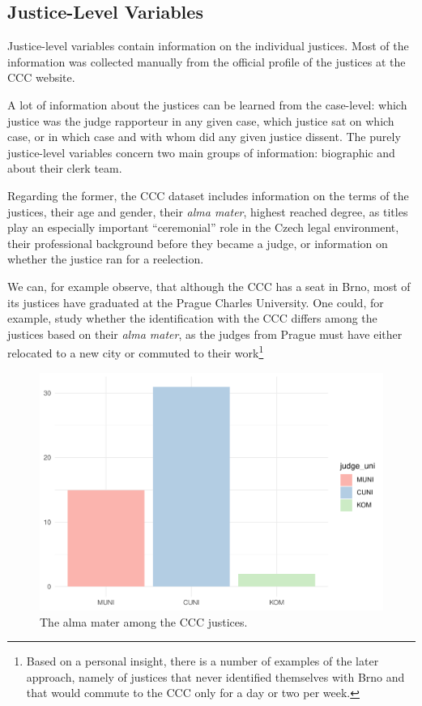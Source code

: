 \documentclass[
  11pt,
]{article}
\begin{document}
\hypertarget{justice-level-variables}{%
\subsection{Justice-Level Variables}\label{justice-level-variables}}

Justice-level variables contain information on the individual justices.
Most of the information was collected manually from the official profile
of the justices at the CCC website.

A lot of information about the justices can be learned from the
case-level: which justice was the judge rapporteur in any given case,
which justice sat on which case, or in which case and with whom did any
given justice dissent. The purely justice-level variables concern two
main groups of information: biographic and about their clerk team.

Regarding the former, the CCC dataset includes information on the terms
of the justices, their age and gender, their \emph{alma mater}, highest
reached degree, as titles play an especially important ``ceremonial''
role in the Czech legal environment, their professional background
before they became a judge, or information on whether the justice ran
for a reelection.

We can, for example observe, that although the CCC has a seat in Brno,
most of its justices have graduated at the Prague Charles University.
One could, for example, study whether the identification with the CCC
differs among the justices based on their \emph{alma mater}, as the
judges from Prague must have either relocated to a new city or commuted
to their work\footnote{Based on a personal insight, there is a number of
  examples of the later approach, namely of justices that never
  identified themselves with Brno and that would commute to the CCC only
  for a day or two per week.}

\begin{figure}
\centering
\includegraphics{apex_courts_dataset_files/figure-latex/alma-1.pdf}
\caption{The alma mater among the CCC justices.}
\end{figure}
\end{document}
